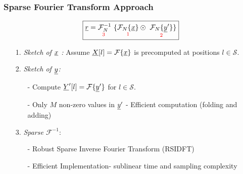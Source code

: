 \begin{frame}\frametitle{Sparse Fourier Transform Approach}
	\begin{figure}[t]
		\centering
		\scalebox{0.28}{}
	\end{figure}
\vspace{-0.2cm}
	 	\begin{block}{}
	 		\begin{equation}\label{eqn:Rxy_fourier}\nonumber
	 		\boxed{\underline{r} = \underset{\text{\color{red} 3 } } {\mathcal{F}_{N}^{-1}} \ \{ \underset{\text{ \color{red} 1 } }{  \mathcal{F}_{N}\{\underline{x}\}}  \odot \ \underset{\text{ \color{red} 2 } }{ \mathcal{F}_{N}\{\underline{y}'\}}  \} }
	 		\end{equation} 
	 		
	 		\begin{itemize} 
	 			\item[\color{red} 1.] \textit{\color{blue} Sketch of $\underline{x}$ : }  Assume $ \underline{X}[l] = \mathcal{F}\{\underline{x}\}$ is precomputed at positions $l \in \mathcal{S}$.
	 			
	 			\item[\color{red} 2.] \textit{\color{blue} Sketch of $\underline{y}$:}
	 			\begin{itemize} 
	 				\item[-] Compute $ \underline{Y}'[l] = \mathcal{F}\{\underline{y}'\}$ for $l \in \mathcal{S}$.
	 				\item[-] Only $M$ non-zero values in $\underline{y}'$ - Efficient computation (folding and adding)
	 			\end{itemize}
	 			
	 			\item[\color{red} 3.] \textit{\color{blue} Sparse $\mathcal{F}^{-1}$}:
	 			\begin{itemize}  
	 				\item[-] Robust Sparse Inverse Fourier Transform (RSIDFT)
	 				\item[-] Efficient Implementation- {\color{blue} sublinear} time and sampling complexity
	 			\end{itemize}
	 		\end{itemize}
	 	\end{block}
\end{frame}

